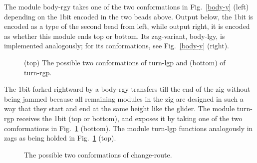 The module body-rgy takes one of the two conformations in Fig.~\ref{body-y} (left) depending on the 1bit encoded in the two beads above.
Output below, the 1bit is encoded as a type of the second bead from left, while output right, it is encoded as whether this module ends top or bottom.
Its zag-variant, body-lgy, is implemented analogously; for its conformations, see Fig.~\ref{body-y} (right).

\begin{figure}[t]
 \centering
{}
 \caption{(top) The possible two conformations of turn-lgp and (bottom) of turn-rgp.}
\label{turn}
\end{figure}

The 1bit forked rightward by a body-rgy transfers till the end of the zig without being jammed because all remaining modules in the zig are designed in such a way that they start and end at the same height like the glider.
The module turn-rgp receives the 1bit (top or bottom), and exposes it by taking one of the two comformations in Fig.~\ref{turn} (bottom).
The module turn-lgp functions analogously in zags as being holded in Fig.~\ref{turn} (top).

\begin{figure}[t]
 \centering
{}
 \caption{The possible two conformations of change-route.}
\label{change_route}
\end{figure}

